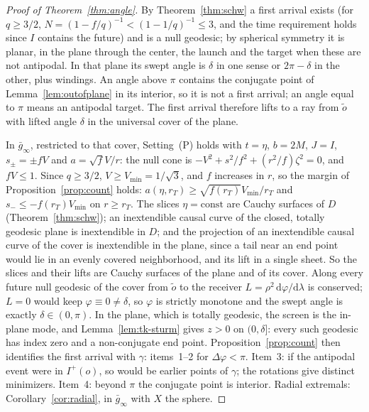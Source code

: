 \documentclass[aip,jmp,amsmath,amssymb,reprint]{revtex4-2}
\newcommand{\dd}{\mathrm{d}}
\theoremstyle{plain}
\theoremstyle{definition}
\begin{document}
\begin{proof}[Proof of Theorem~\ref{thm:angle}]
By Theorem~\ref{thm:schw} a first arrival exists (for $q\ge3/2$, $N=(1-f/q)^{-1}<(1-1/q)^{-1}\le3$, and the time
requirement holds since $I$ contains the future) and is a null geodesic; by spherical symmetry
it is planar, in the plane through the center, the launch and the target when these are not
antipodal. In that plane its swept angle is $\delta$ in one sense or $2\pi-\delta$ in the other,
plus windings. An angle above $\pi$ contains the conjugate point of Lemma~\ref{lem:outofplane}
in its interior, so it is not a first arrival; an angle equal to $\pi$ means an antipodal
target. The first arrival therefore lifts to a ray from $\tilde o$ with lifted angle $\delta$ in the
universal cover of the plane.

In $\bar g_\infty$, restricted to that cover, Setting~(P) holds with $t=\eta$, $b=2M$, $J=I$,
$s_\pm=\pm fV$ and $a=\sqrt fV/r$: the null cone is $-V^2+s^2/f^2+(r^2/f)\zeta^2=0$, and $fV\le1$. Since
$q\ge3/2$, $V\ge V_{\min}=1/\sqrt3$, and $f$ increases in $r$, so the margin of Proposition~\ref{prop:count} holds:
$a(\eta,r_T)\ge\sqrt{f(r_T)}V_{\min}/r_T$ and $s_-\le-f(r_T)V_{\min}$ on $r\ge r_T$. The slices
$\eta=\mathrm{const}$ are Cauchy surfaces of $D$ (Theorem~\ref{thm:schw}); an inextendible causal curve
of the closed, totally geodesic plane is inextendible in $D$; and the projection of an inextendible
causal curve of the cover is inextendible in the plane, since a tail near an end point would lie in an
evenly covered neighborhood, and its lift in a single sheet. So the slices and their lifts are
Cauchy surfaces of the plane and of its cover.
Along every future null geodesic of the cover from $\tilde o$ to the receiver $L=\rho^2\,\dd\varphi/\dd\lambda$
is conserved; $L=0$ would keep $\varphi\equiv0\ne\delta$, so $\varphi$ is strictly monotone and the swept angle
is exactly $\delta\in(0,\pi)$. In the plane, which is totally geodesic, the screen is the in-plane
mode, and Lemma~\ref{lem:tk-sturm} gives $z>0$ on $(0,\delta]$: every such geodesic has index zero
and a non-conjugate end point. Proposition~\ref{prop:count} then identifies the first arrival with
$\gamma$: items~1--2 for $\Delta\varphi<\pi$. Item~3: if the antipodal event were in $I^+(o)$, so would be
earlier points of $\gamma$; the rotations give distinct minimizers. Item~4: beyond $\pi$ the conjugate
point is interior. Radial extremals: Corollary~\ref{cor:radial}, in $\bar g_\infty$ with $X$ the sphere.
\end{proof}
\end{document}
